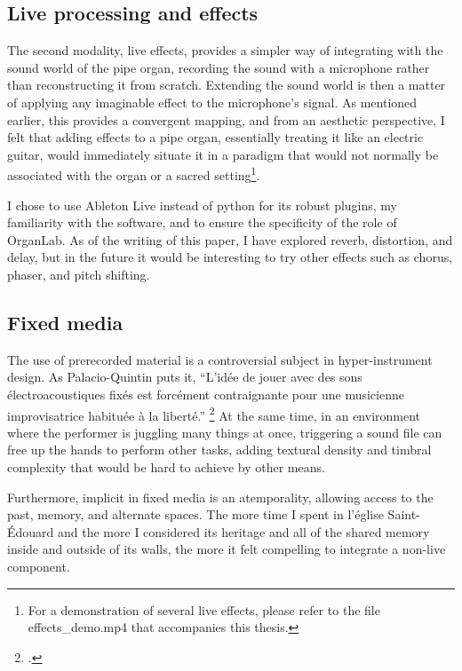 \documentclass[12pt,twoside,maitrise]{dms_ks}
\theoremstyle{definition}
\begin{document}
{\subsection{Live processing and effects}

The second modality, live effects, provides a simpler way of integrating with the sound world of the pipe organ, recording the sound with a microphone rather than reconstructing it from scratch. 
Extending the sound world is then a matter of applying any imaginable effect to the microphone's signal. As mentioned earlier, this provides a convergent mapping, and from an aesthetic perspective, I felt that adding effects to a pipe organ, essentially treating it like an electric guitar, would immediately situate it in a paradigm that would not normally be associated with the organ or a sacred setting\footnote{For a demonstration of several live effects, please refer to the file effects\_demo.mp4 that accompanies this thesis.}.

I chose to use Ableton Live instead of python for its robust plugins, my familiarity with the software, and to ensure the specificity of the role of OrganLab. As of the writing of this paper, I have explored reverb, distortion, and delay, but in the future it would be interesting to try other effects such as chorus, phaser, and pitch shifting. 

\subsection{Fixed media}

The use of prerecorded material is a controversial subject in hyper-instrument design.
As Palacio-Quintin puts it, “L’idée de jouer avec des sons électroacoustiques fixés est forcément contraignante pour une musicienne improvisatrice habituée à la liberté.” \footcite[50]{palacio-quintin_composition_2012-1}
At the same time, in an environment where the performer is juggling many things at once, triggering a sound file can free up the hands to perform other tasks, adding textural density and timbral complexity that would be hard to achieve by other means. 


Furthermore, implicit in fixed media is an atemporality, allowing access to the past, memory, and alternate spaces.
The more time I spent in l'église Saint-Édouard and the more I considered its heritage and all of the shared memory inside and outside of its walls, the more it felt compelling to integrate a non-live component.

}
\end{document}
